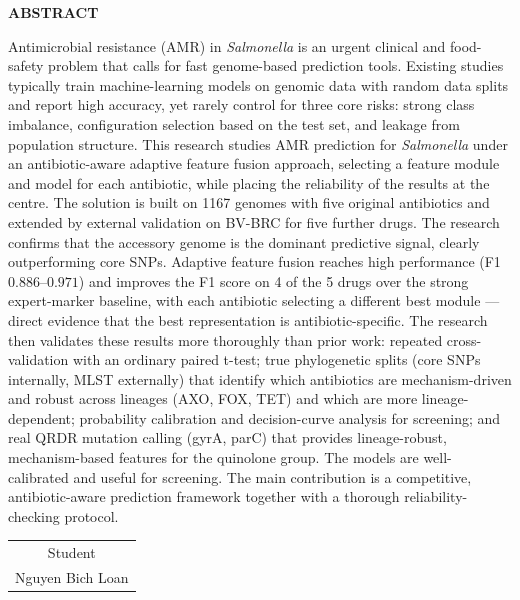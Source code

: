 \documentclass[../main.tex]{subfiles}
\begin{document}
\begin{center}
    \Large{\textbf{ABSTRACT}}\\
\end{center}
\vspace{1cm}

Antimicrobial resistance (AMR) in \textit{Salmonella} is an urgent clinical and food-safety problem that calls for fast genome-based prediction tools. Existing studies typically train machine-learning models on genomic data with random data splits and report high accuracy, yet rarely control for three core risks: strong class imbalance, configuration selection based on the test set, and leakage from population structure. This research studies AMR prediction for \textit{Salmonella} under an antibiotic-aware adaptive feature fusion approach, selecting a feature module and model for each antibiotic, while placing the reliability of the results at the centre. The solution is built on 1167 genomes with five original antibiotics and extended by external validation on BV-BRC for five further drugs. The research confirms that the accessory genome is the dominant predictive signal, clearly outperforming core SNPs. Adaptive feature fusion reaches high performance (F1 $0.886$--$0.971$) and improves the F1 score on 4 of the 5 drugs over the strong expert-marker baseline, with each antibiotic selecting a different best module --- direct evidence that the best representation is antibiotic-specific. The research then validates these results more thoroughly than prior work: repeated cross-validation with an ordinary paired t-test; true phylogenetic splits (core SNPs internally, MLST externally) that identify which antibiotics are mechanism-driven and robust across lineages (AXO, FOX, TET) and which are more lineage-dependent; probability calibration and decision-curve analysis for screening; and real QRDR mutation calling (gyrA, parC) that provides lineage-robust, mechanism-based features for the quinolone group. The models are well-calibrated and useful for screening. The main contribution is a competitive, antibiotic-aware prediction framework together with a thorough reliability-checking protocol.

\begin{flushright}
\begin{tabular}{@{}c@{}}
Student\\
Nguyen Bich Loan
\end{tabular}
\end{flushright}
\end{document}
